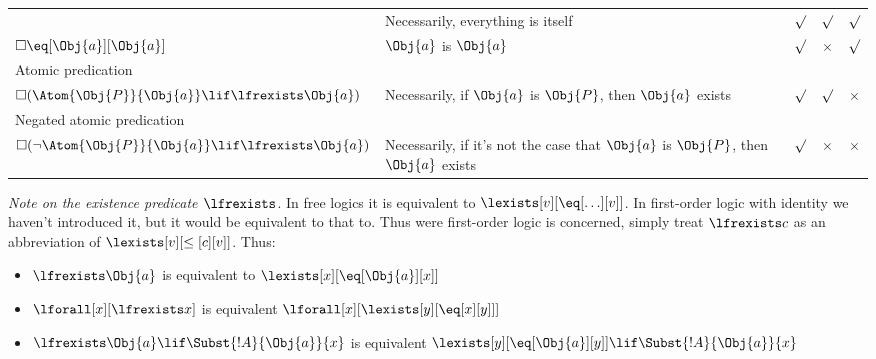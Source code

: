 \documentclass[../../../../include/open-logic-section]{subfiles}
\begin{document}
\begin{center}
\begin{tabular}[t]{p{}p{}ccc}
        & Necessarily, everything is itself
        & $\surd$ & $\surd$ & $\surd$ \\
    $\Box\eq[\Obj{a}][\Obj{a}]$
        & $\Obj{a}$ is $\Obj{a}$
        & $\surd$ & $\times$ & $\surd$ \\
    \multicolumn{2}{l}{Atomic predication} \\
    $\Box(\Atom{\Obj{P}}{\Obj{a}}\lif\lfrexists\Obj{a})$ 
        & Necessarily, if $\Obj{a}$ is $\Obj{P}$, then $\Obj{a}$ exists 
        & $\surd$ & $\surd$ & $\times$ \\
    \multicolumn{2}{l}{Negated atomic predication} \\
    $\Box(\lnot \Atom{\Obj{P}}{\Obj{a}}\lif\lfrexists\Obj{a})$ 
        & Necessarily, if it's not the case that $\Obj{a}$ is $\Obj{P}$, then $\Obj{a}$ exists 
        & $\surd$ & $\times$ & $\times$ \\
    \hline
\end{tabular}
\smallskip
\end{center}

\emph{Note on the existence predicate $\lfrexists$}. In free logics
it is equivalent to $\lexists[v][\eq[\ldots][v]]$. In first-order
logic with identity we haven't introduced it, but it would be
equivalent to that to. Thus were first-order logic is concerned,
simply treat $\lfrexists c$ as an abbreviation of
 $\lexists[v][\leq[c][v]]$.
Thus:
\begin{itemize}
    \item $\lfrexists \Obj{a}$ is 
    equivalent to $\lexists[x][\eq[\Obj{a}][x]]$
    \item $\lforall[x][\lfrexists x]$ is 
    equivalent $\lforall[x][\lexists[y][\eq[x][y]]]$
    \item $\lfrexists\Obj{a}\lif\Subst{!A}{\Obj{a}}{x}$ is 
    equivalent $\lexists[y][\eq[\Obj{a}][y]]\lif\Subst{!A}{\Obj{a}}{x}$
\end{itemize}
\end{document}
